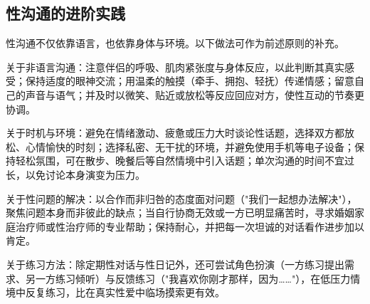 \subsection{性沟通的进阶实践}

性沟通不仅依靠语言，也依靠身体与环境。以下做法可作为前述原则的补充。

关于非语言沟通：注意伴侣的呼吸、肌肉紧张度与身体反应，以此判断其真实感受；保持适度的眼神交流；用温柔的触摸（牵手、拥抱、轻抚）传递情感；留意自己的声音与语气；并及时以微笑、贴近或放松等反应回应对方，使性互动的节奏更协调。

关于时机与环境：避免在情绪激动、疲惫或压力大时谈论性话题，选择双方都放松、心情愉快的时刻；选择私密、无干扰的环境，并避免使用手机等电子设备；保持轻松氛围，可在散步、晚餐后等自然情境中引入话题；单次沟通的时间不宜过长，以免讨论本身演变为压力。

关于性问题的解决：以合作而非归咎的态度面对问题（"我们一起想办法解决"），聚焦问题本身而非彼此的缺点；当自行协商无效或一方已明显痛苦时，寻求婚姻家庭治疗师或性治疗师的专业帮助；保持耐心，并把每一次坦诚的对话看作进步加以肯定。

关于练习方法：除定期性对话与性日记外，还可尝试角色扮演（一方练习提出需求、另一方练习倾听）与反馈练习（"我喜欢你刚才那样，因为……"），在低压力情境中反复练习，比在真实性爱中临场摸索更有效。
